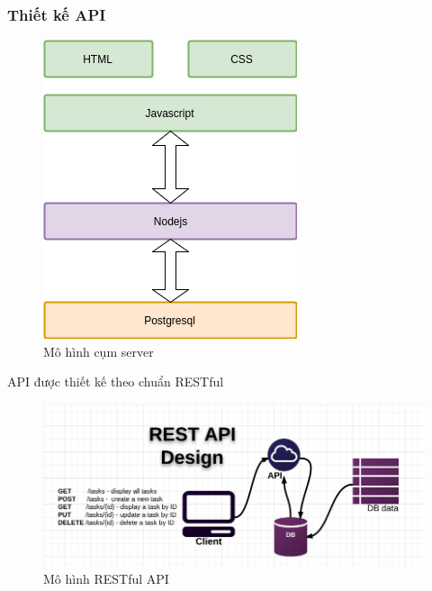 \documentclass[a4paper,12pt,oneside]{article}
\begin{document}
\subsubsection{Thiết kế API}

\begin{figure}[H]
	\centering
	\includegraphics[scale=.9]{hinh/server.png}
	\caption{Mô hình cụm server}
\end{figure}


\noindent API được thiết kế theo chuẩn RESTful

\begin{figure}[htp]
	\centering
	\includegraphics[scale=.5]{hinh/RESTful-API-design.jpg}
	\caption{Mô hình RESTful API}
\end{figure}
\end{document}
